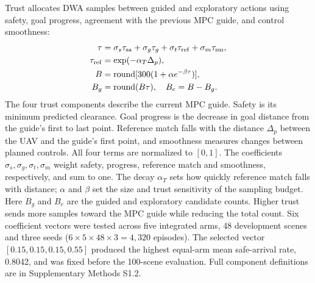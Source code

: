 \documentclass[conference,letterpaper]{IEEEtran}
\begin{document}
Trust allocates DWA samples between guided and exploratory actions using safety, goal progress, agreement with the previous MPC guide, and control smoothness:
\begingroup\small
\begin{equation}
\begin{aligned}
\tau&=\sigma_s\tau_{\rm sa}+\sigma_g\tau_g+\sigma_t\tau_{\rm ref}+\sigma_m\tau_{\rm sm},\\
\tau_{\rm ref}&=\exp(-\alpha_T\Delta_p),\\
B&=\operatorname{round}[300(1+\alpha e^{-\beta\tau})],\\
B_g&=\operatorname{round}(B\tau),\quad B_e=B-B_g.
\end{aligned}
\label{eq:trust}
\end{equation}
\endgroup
The four trust components describe the current MPC guide. Safety is its minimum predicted clearance. Goal progress is the decrease in goal distance from the guide's first to last point. Reference match falls with the distance $\Delta_p$ between the UAV and the guide's first point, and smoothness measures changes between planned controls. All four terms are normalized to $[0,1]$. The coefficients $\sigma_s,\sigma_g,\sigma_t,\sigma_m$ weight safety, progress, reference match and smoothness, respectively, and sum to one. The decay $\alpha_T$ sets how quickly reference match falls with distance; $\alpha$ and $\beta$ set the size and trust sensitivity of the sampling budget. Here $B_g$ and $B_e$ are the guided and exploratory candidate counts. Higher trust sends more samples toward the MPC guide while reducing the total count. Six coefficient vectors were tested across five integrated arms, 48 development scenes and three seeds ($6\times5\times48\times3=4{,}320$ episodes). The selected vector $[0.15,0.15,0.15,0.55]$ produced the highest equal-arm mean safe-arrival rate, 0.8042, and was fixed before the 100-scene evaluation. Full component definitions are in Supplementary Methods S1.2.
\end{document}
